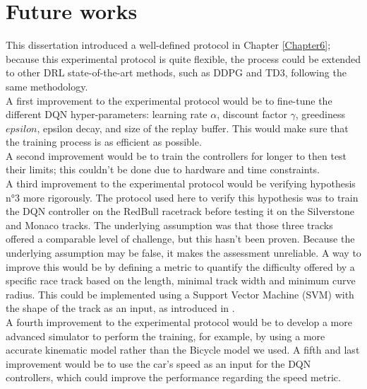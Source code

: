 \section{Future works}
\label{futureworks}
This dissertation introduced a well-defined protocol in Chapter \ref{Chapter6}; because this experimental protocol is quite flexible, the process could be extended to other DRL state-of-the-art methods, such as DDPG and TD3, following the same methodology. \\
A first improvement to the experimental protocol would be to fine-tune the different DQN hyper-parameters: learning rate $\alpha$, discount factor $\gamma$, greediness $epsilon$, epsilon decay, and size of the replay buffer. This would make sure that the training process is as efficient as possible. \\
A second improvement would be to train the controllers for longer to then test their limits; this couldn't be done due to hardware and time constraints. \\
A third improvement to the experimental protocol would be verifying hypothesis n°3 more rigorously. The protocol used here to verify this hypothesis was to train the DQN controller on the RedBull racetrack before testing it on the Silverstone and Monaco tracks. The underlying assumption was that those three tracks offered a comparable level of challenge, but this hasn't been proven. Because the underlying assumption may be false, it makes the assessment unreliable. A way to improve this would be by defining a metric to quantify the difficulty offered by a specific race track based on the length, minimal track width and minimum curve radius. This could be implemented using a Support Vector Machine (SVM) with the shape of the track as an input, as introduced in \cite{futurework}.\\
A fourth improvement to the experimental protocol would be to develop a more advanced simulator to perform the training, for example, by using a more accurate kinematic model rather than the Bicycle model we used.
A fifth and last improvement would be to use the car's speed as an input for the DQN controllers, which could improve the performance regarding the speed metric.